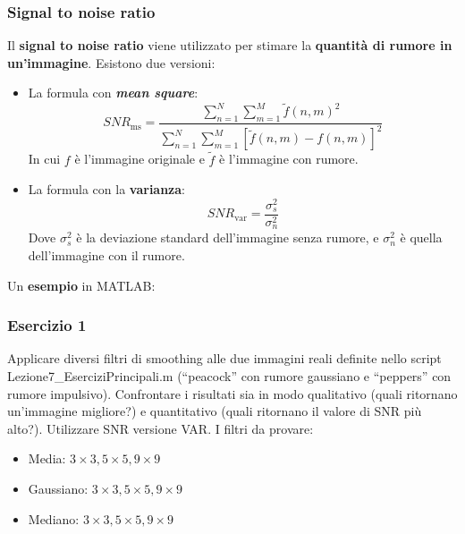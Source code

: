 \documentclass[a4paper]{article}
\newcommand{\dquotes}[1]{``#1''}
\begin{document}
	\subsubsection{Signal to noise ratio}
	
	Il \textcolor{Red3}{\textbf{signal to noise ratio}} viene utilizzato per stimare la \textbf{quantità di rumore in un'immagine}. Esistono due versioni:
	\begin{itemize}
		\item La formula con \textbf{\emph{mean square}}:
		\begin{equation*}
			SNR_{\text{ms}} = \dfrac{
				\displaystyle\sum_{n=1}^{N} \sum_{m=1}^{M} \tilde{f}\left(n,m\right)^{2}
			}{
				\displaystyle\sum_{n=1}^{N} \sum_{m=1}^{M} \left[\tilde{f}\left(n,m\right) - f\left(n,m\right)\right]^{2}
			}
		\end{equation*}
		In cui $f$ è l'immagine originale e $\tilde{f}$ è l'immagine con rumore.
		
		\item La formula con la \textbf{varianza}:
		\begin{equation*}
			SNR_{\text{var}} = \dfrac{\sigma^{2}_{s}}{\sigma^{2}_{n}}
		\end{equation*}
		Dove $\sigma^{2}_{s}$ è la deviazione standard dell'immagine senza rumore, e $\sigma^{2}_{n}$ è quella dell'immagine con il rumore.
	\end{itemize}
	Un \textcolor{Green4}{\textbf{esempio}} in MATLAB:
	\newpage
	
	\subsubsection{Esercizio 1}
	
	Applicare diversi filtri di smoothing alle due immagini reali definite nello script \textsf{Lezione7\_EserciziPrincipali.m} (\dquotes{peacock} con rumore gaussiano e \dquotes{peppers} con rumore impulsivo). Confrontare i risultati sia in modo qualitativo (quali ritornano un'immagine migliore?) e quantitativo (quali ritornano il valore di SNR più alto?). Utilizzare SNR versione VAR. I filtri da provare:
	\begin{itemize}
		\item Media: $3\times3, 5\times5, 9\times9$
		
		\item Gaussiano: $3\times3, 5\times5, 9\times9$
		
		\item Mediano: $3\times3, 5\times5, 9\times9$
	\end{itemize}
	
\end{document}
